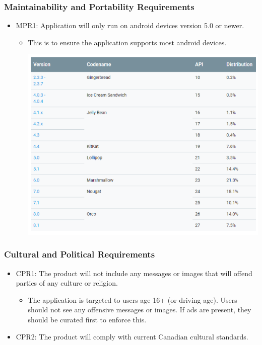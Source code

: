 \documentclass[]{article}
\begin{document}
\subsubsection{Maintainability and Portability Requirements}
\begin{itemize}
	\item MPR1: Application will only run on android devices version 5.0 or newer.
	\begin{itemize}
		\item This is to ensure the application supports most android devices.
		\begin{center}
			\includegraphics[width=\textwidth,height=\textheight,keepaspectratio]{mp}
		\end{center}
	\end{itemize}
\end{itemize}
\subsubsection{Cultural and Political Requirements}
\begin{itemize}
	\item CPR1: The product will not include any messages or images that will offend parties of any culture or religion.
	\begin{itemize}
		\item The application is targeted to users age 16+ (or driving age). Users should not see any offensive messages or images. If ads are present, they should be curated first to enforce this.
	\end{itemize}
	
	\item CPR2: The product will comply with current Canadian cultural standards.
\end{itemize}
\end{document}
